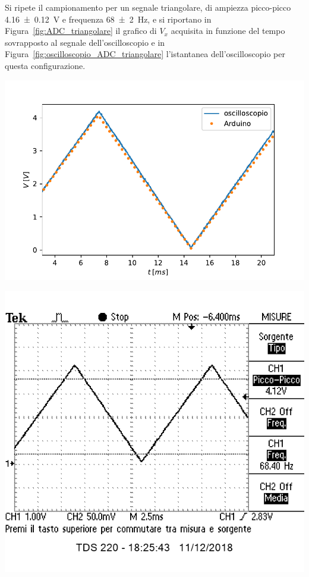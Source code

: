 \documentclass[10pt,oneside,a4paper]{article}
\newenvironment{Figure}
  {\par\medskip\noindent\minipage{\linewidth}}
  {\endminipage\par\medskip}
\begin{document}
\begin{multicols}{2}
Si ripete il campionamento per un segnale triangolare, di ampiezza picco-picco \SI{4.16 \pm 0.12}{V} e frequenza \SI{68 \pm 2}{\Hz}, e si riportano in Figura~\ref{fig:ADC_triangolare} il grafico di $V_x$ acquisita in funzione del tempo sovrapposto al segnale dell'oscilloscopio e in Figura~\ref{fig:oscilloscopio_ADC_triangolare} l'istantanea dell'oscilloscopio per questa configurazione.

\begin{Figure}
	\begin{center}
	\includegraphics[width=\linewidth]{triangolareSovrapposta}
	\label{fig:ADC_triangolare}
	\end{center}
\end{Figure}

\begin{Figure}
	\begin{center}
	\includegraphics[width=\linewidth]{triangADC}
	\label{fig:oscilloscopio_ADC_triangolare}
	\end{center}
\end{Figure}


\end{multicols}
\end{document}
